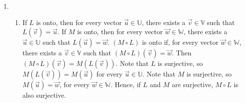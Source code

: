 \documentclass[10pt,english]{article}
\begin{document}
\begin{enumerate}
\begin{enumerate}
    $$L(s(a(x^2-1)+b(x-1))+t(c(x^2-1)+d(x-1)))=L((as+ct)(x^2-1)+(bs+dt)(x-1))=\begin{bmatrix}sa+tc&sb+td\\0&sa+tc\end{bmatrix}$$ $$sL(a(x-1)+b(x^2-1))+tL(c(x-1)+d(x^2-1))=\begin{bmatrix}sa&sb\\0&sa\end{bmatrix}+\begin{bmatrix}tc&td\\0&tc\end{bmatrix}=\begin{bmatrix}sa+tc&sb+td\\0&sa+tc\end{bmatrix}$$ Therefore, $L$ is linear. \\ 
    By Lemma 8.4.1 and Theorem 8.4.3, $L$ is bijective if Ker$(L)=\{\vec{0}\}$. Let $a(x-1)+b(x^2-1)\in\text{Ker}(L)$. Then $\begin{bmatrix}0&0\\0&0\end{bmatrix}=L(a(x^2-1)+b(x-1))=\begin{bmatrix}a&b\\0&a\end{bmatrix}\Rightarrow a=b=0$. Thus $a(x-1)+b(x^2-1)=0$, and Ker$(L)=\{\vec{0}\}$. Therefore, $L$ is bijective, and since it is bijective and linear, it is an isomorphism.
\end{enumerate}

\pagebreak
\item \begin{enumerate}
    \item If $L$ is onto, then for every vector $\vec{u}\in\mathbb{U}$, there exists a $\vec{v}\in\mathbb{V}$ such that $L(\vec{v})=\vec{u}$. If $M$ is onto, then for every vector $\vec{w}\in\mathbb{W}$, there exists a $\vec{u}\in\mathbb{U}$ such that $L(\vec{u})=\vec{w}$. $(M\circ L)$ is onto if, for every vector $\vec{w}\in\mathbb{W}$, there exists a $\vec{v}\in\mathbb{V}$ such that $(M\circ L)(\vec{v})=\vec{w}$. Then $(M\circ L)(\vec{v})=M(L(\vec{v}))$. Note that $L$ is surjective, so $M(L(\vec{v}))=M(\vec{u})$ for every $\vec{u}\in\mathbb{U}$. Note that $M$ is surjective, so $M(\vec{u})=\vec{w}$, for every $\vec{w}\in\mathbb{W}$. Hence, if $L$ and $M$ are surjective, $M\circ L$ is also surjective. 
    

\end{enumerate}
\end{enumerate}
\end{document}
